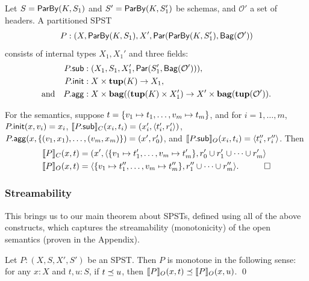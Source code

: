 \begin{definition}
Let $\ss = \keyby{K}{\ss_1}$ and $\ss' = \keyby{K}{\ss_1'}$ be schemas,
and $\mathcal{O}'$ a set of headers.
A partitioned SPST
\[
P : (X, \keyby{K}{\ss_1}, X', \parcomp{\keyby{K}{\ss_1'}}{\relleaf{\mathcal{O}'}}
\]
consists of internal types $X_1, X_1'$ and three fields:
\begin{align*}
\spstfield{P}{sub} &: (X_1, \ss_1, X_1', \parcomp{\ss_1'}{\relleaf{\mathcal{O}'}}), \\
\spstfield{P}{init} &: X \times \tup(K) \to X_1, \\
\text{and} \quad
\spstfield{P}{agg} &: X \times \bag((\tup(K) \times X_1') \to X' \times \bag(\tup(\mathcal{O}')).
\end{align*}

For the semantics,
suppose $t = \spsbag{\keyed{v_1}{t_1}, \ldots, \keyed{v_m}{t_m}}$,
and for $i = 1, \ldots, m$,
$\spstfield{P}{init}(x, v_i) = x_i$,
$\spstsemC{x_i}{t_i}{\spstfield{P}{sub}} = (x_i', \spspar{t_i'}{r_i'})$,
$\spstfield{P}{agg}(x, \{(v_1, x_1), \ldots, (v_m, x_m)\}) = (x', r_0')$,
and
$\spstsemO{x_i}{t_i}{\spstfield{P}{sub}} = \spspar{t_i''}{r_i''}$.
Then
\begin{align*}
    \spstsemC{x}{t}{P}
    &= (x', \spspar{ \spsbag{\keyed{v_1}{t_1'}, \ldots, \keyed{v_m}{t_m'}}}{r_0' \cup r_1' \cup \cdots \cup r_m'}
    \\
    \spstsemO{x}{t}{P}
    &= \spspar{\spsbag{\keyed{v_1}{t_1''}, \ldots, \keyed{v_m}{t_m''}}}{r_1'' \cup \cdots \cup r_m''}.
    \quad \qed
\end{align*}
\end{definition}

\subsubsection{Streamability}

This brings us to our main theorem about SPSTs,
defined using all of the above constructs,
which captures the streamability
(monotonicity) of the open semantics
(proven in the Appendix).

\begin{theorem}
\label{thm:spst-monotonicity}
Let $P: (X, S, X', S')$ be an SPST.
Then $P$ is monotone in the following sense:
for any $x: X$ and $t, u: S$,
if $t\prefix u$,
then $\spstsemO{x}{t}{P} \prefix \spstsemO{x}{u}{P}$.
\qed
\end{theorem}
